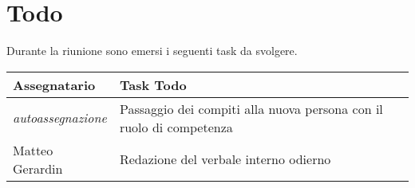 \section{Todo}
Durante la riunione sono emersi i seguenti task da svolgere.

\begin{center}
  \begin{tabular}{|L{5cm}|L{8cm}|}
    \hline
    \textbf{Assegnatario} & \textbf{Task Todo} \\ \hline
        \textit{autoassegnazione} & Passaggio dei compiti alla nuova persona con il ruolo di competenza \\ \hline
        Matteo Gerardin & Redazione del verbale interno odierno \\ \hline
  \end{tabular}
\end{center}